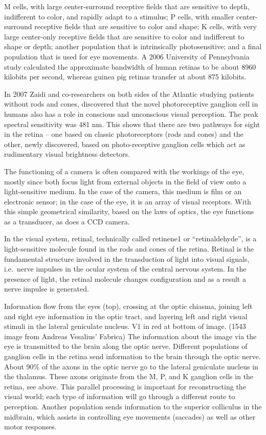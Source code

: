 M cells, with large center-surround receptive fields that are sensitive to depth, indifferent to color, and rapidly adapt to a stimulus;
P cells, with smaller center-surround receptive fields that are sensitive to color and shape;
K cells, with very large center-only receptive fields that are sensitive to color and indifferent to shape or depth;
another population that is intrinsically photosensitive; and
a final population that is used for eye movements.
A 2006 University of Pennsylvania study calculated the approximate bandwidth of human retinas to be about 8960 kilobits per second, whereas guinea pig retinas transfer at about 875 kilobits.

In 2007 Zaidi and co-researchers on both sides of the Atlantic studying patients without rods and cones, discovered that the novel photoreceptive ganglion cell in humans also has a role in conscious and unconscious visual perception. The peak spectral sensitivity was 481 nm. This shows that there are two pathways for sight in the retina -- one based on classic photoreceptors (rods and cones) and the other, newly discovered, based on photo-receptive ganglion cells which act as rudimentary visual brightness detectors.

The functioning of a camera is often compared with the workings of the eye, mostly since both focus light from external objects in the field of view onto a light-sensitive medium. In the case of the camera, this medium is film or an electronic sensor; in the case of the eye, it is an array of visual receptors. With this simple geometrical similarity, based on the laws of optics, the eye functions as a transducer, as does a CCD camera.

In the visual system, retinal, technically called retinene1 or ``retinaldehyde'', is a light-sensitive molecule found in the rods and cones of the retina. Retinal is the fundamental structure involved in the transduction of light into visual signals, i.e.~nerve impulses in the ocular system of the central nervous system. In the presence of light, the retinal molecule changes configuration and as a result a nerve impulse is generated.

Information flow from the eyes (top), crossing at the optic chiasma, joining left and right eye information in the optic tract, and layering left and right visual stimuli in the lateral geniculate nucleus. V1 in red at bottom of image. (1543 image from Andreas Vesalius' Fabrica)
The information about the image via the eye is transmitted to the brain along the optic nerve. Different populations of ganglion cells in the retina send information to the brain through the optic nerve. About 90\% of the axons in the optic nerve go to the lateral geniculate nucleus in the thalamus. These axons originate from the M, P, and K ganglion cells in the retina, see above. This parallel processing is important for reconstructing the visual world; each type of information will go through a different route to perception. Another population sends information to the superior colliculus in the midbrain, which assists in controlling eye movements (saccades) as well as other motor responses.

